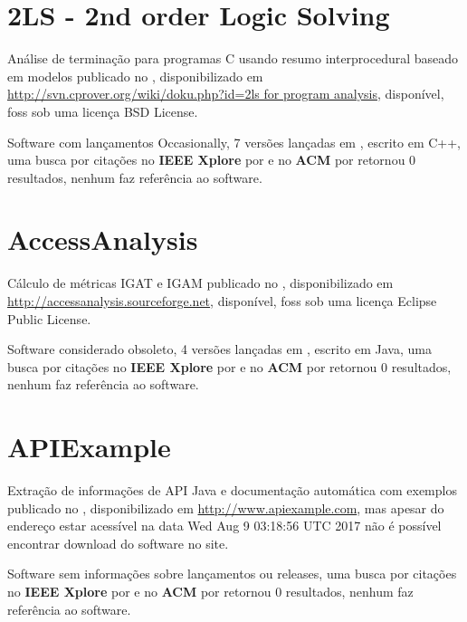 
%

\label{softwares-summary}

\section{2LS - 2nd order Logic Solving}

Análise de terminação para programas C usando resumo interprocedural baseado em modelos
publicado no  ,
disponibilizado em \url{http://svn.cprover.org/wiki/doku.php?id=2ls for program analysis},
disponível,
foss
sob uma licença BSD License.

Software com lançamentos Occasionally,
7 versões lançadas
em ,
escrito em C++,
uma busca por citações no {\bf IEEE Xplore} por
\texttt{}
e no {\bf ACM} por
\texttt{}
retornou
0 resultados,
nenhum faz referência ao software.



\section{AccessAnalysis}

Cálculo de métricas IGAT e IGAM
publicado no  ,
disponibilizado em \url{http://accessanalysis.sourceforge.net},
disponível,
foss
sob uma licença Eclipse Public License.

Software considerado obsoleto,
4 versões lançadas
em ,
escrito em Java,
uma busca por citações no {\bf IEEE Xplore} por
\texttt{}
e no {\bf ACM} por
\texttt{}
retornou
0 resultados,
nenhum faz referência ao software.



\section{APIExample}

Extração de informações de API Java e documentação automática com exemplos
publicado no  ,
disponibilizado em \url{http://www.apiexample.com},
mas apesar do endereço estar acessível na data 
Wed Aug  9 03:18:56 UTC 2017
não é possível encontrar download do software no site.

Software sem informações sobre lançamentos ou releases,
uma busca por citações no {\bf IEEE Xplore} por
\texttt{}
e no {\bf ACM} por
\texttt{}
retornou
0 resultados,
nenhum faz referência ao software.



